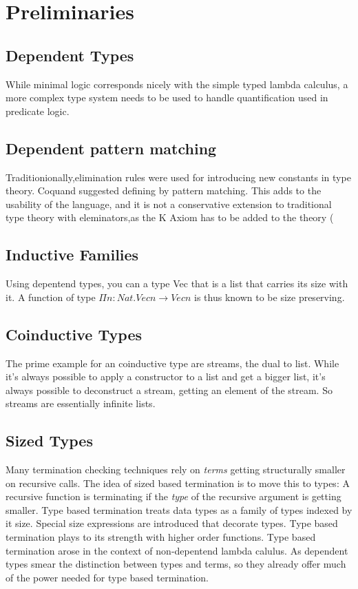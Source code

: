 \chapter{Preliminaries}

\section{Dependent Types}
While minimal logic corresponds nicely with the simple typed lambda calculus,
a more complex type system needs to be used to handle quantification used in predicate logic.

\section{Dependent pattern matching}
Traditionionally,elimination rules were used for introducing new constants in type theory.
Coquand suggested defining by pattern matching.
This adds to the usability of the language, and it is not a conservative extension to traditional type theory
with eleminators,as the K Axiom has to be added to the theory (\cite{hofmann95groupoid,GoguHMcBrCM2006}

\section{Inductive Families}

Using depentend types, you can a type Vec that is a list that carries its size with it.
A function of type \(\Pi n : Nat . Vec n \rightarrow Vec n \) is thus known to be size preserving. 
\section{Coinductive Types}

The prime example for an coinductive type are streams, the dual to list.
While it's always possible to apply a constructor to a list and get a bigger list, it's always
possible to deconstruct a stream, getting an element of the stream.
So streams are essentially infinite lists.  

\section{Sized Types}

Many termination checking techniques rely on \emph{terms} getting structurally smaller on recursive calls.
The idea of sized based termination \cite{abel:PhD} is to move this to types:
A recursive function is terminating if the \emph{type} of the recursive argument is getting smaller.
Type based termination treats data types as a family of types indexed by it size.
Special size expressions are introduced that decorate types.
Type based termination plays to its strength with higher order functions. 
Type based termination arose in the context of non-depentend lambda calulus.
As dependent types smear the distinction between types and terms, so they already offer much of the power needed for type based termination.